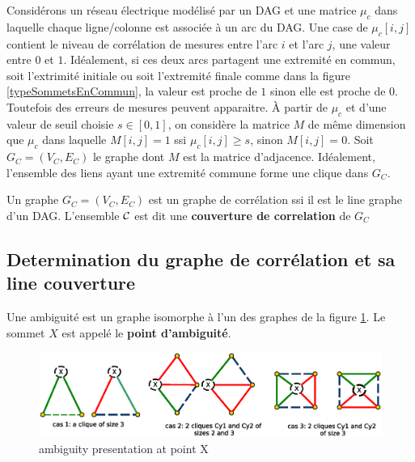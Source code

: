 Consid\'erons un r\'eseau \'electrique mod\'elis\'e  par un DAG et une matrice $\mu_c$ dans laquelle chaque ligne/colonne est associ\'ee \`a un arc du DAG.
Une case de $\mu_c[i,j]$ contient le niveau de corr\'elation de mesures entre l'arc $i$ et l'arc $j$, une valeur entre $0$ et $1$.
Id\'ealement, si ces deux arcs partagent une extremit\'e en commun, soit l'extrimit\'e initiale ou soit l'extremit\'e finale comme dans la figure \ref{typeSommetsEnCommun}, la valeur est proche de $1$ sinon elle est proche de $0$.
Toutefois des erreurs de mesures peuvent apparaitre.
\newline
\`A partir de $\mu_c$ et d'une valeur de seuil choisie $s \in [0,1]$, on consid\`ere la matrice $M$ de m\^eme dimension que $\mu_{c}$ dans laquelle 
$M[i,j] = 1$ ssi $\mu_c[i,j] \ge s$, sinon $M[i,j] = 0$. 
\newline
Soit $G_C = (V_C,E_C)$ le graphe dont $M$ est la matrice d'adjacence.
Id\'ealement, l'ensemble des liens ayant une extremit\'e commune forme une clique dans $G_C$.

\begin{definition}
	Un graphe $G_C = (V_C, E_C)$ est un graphe de corr\'elation ssi il est le line graphe d'un DAG.
	L'ensemble $\cal C$ est dit une {\bf couverture de correlation} de $G_C$
\end{definition}

\subsection{Determination du graphe de corr\'elation et sa line couverture}
	\begin{definition}
	Une ambiguit\'e est un graphe isomorphe \`a l'un des graphes de la figure \ref{configurationAmbiguite}. Le sommet $X$ est appel\'e le {\bf point d'ambiguit\'e}.
	\end{definition}
	
	\begin{centering}\vspace{-0.5em}
	\begin{figure}[htb!]\vspace{-0.5em}
	\includegraphics[scale=0.40]{./imagesLineGraphes/configurationAmbiguite.eps}\vspace{-0.5em}
	\caption{ ambiguity presentation at point X }\vspace{-0.5em}
	\label{configurationAmbiguite}
	\end{figure}
	\end{centering}
	
